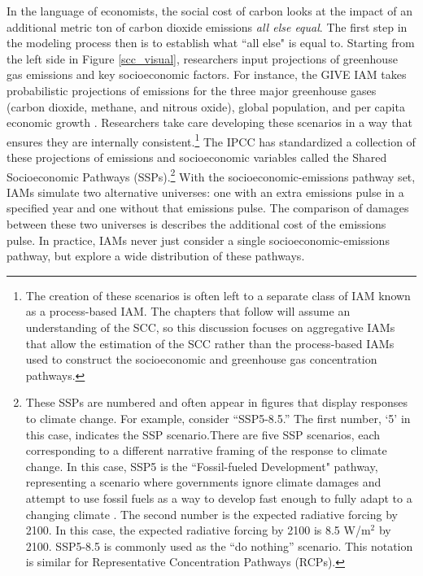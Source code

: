 In the language of economists, the social cost of carbon looks at the impact of an additional metric ton of carbon dioxide emissions \emph{all else equal}. The first step in the modeling process then is to establish what ``all else" is equal to. Starting from the left side in Figure \ref{scc_visual}, researchers input projections of greenhouse gas emissions and key socioeconomic factors. For instance, the GIVE IAM takes probabilistic projections of emissions for the three major greenhouse gases (carbon dioxide, methane, and nitrous oxide), global population, and per capita economic growth \citep{rennert2022comprehensive}. Researchers take care developing these scenarios in a way that ensures they are internally consistent.\footnote{The creation of these scenarios is often left to a separate class of IAM known as a process-based IAM. The chapters that follow will assume an understanding of the SCC, so this discussion focuses on aggregative IAMs that allow the estimation of the SCC rather than the process-based IAMs used to construct the socioeconomic and greenhouse gas concentration pathways.} The IPCC has standardized a collection of these projections of emissions and socioeconomic variables called the Shared Socioeconomic Pathways (SSPs).\footnote{These SSPs are numbered and often appear in figures that display responses to climate change. For example, consider ``SSP5-8.5.'' The first number, `5' in this case, indicates the SSP scenario.There are five SSP scenarios, each corresponding to a different narrative framing of the response to climate change. In this case, SSP5 is the ``Fossil-fueled Development" pathway, representing a scenario where governments ignore climate damages and attempt to use fossil fuels as a way to develop fast enough to fully adapt to a changing climate \citep{hausfather2018explainer}. The second number is the expected radiative forcing by 2100. In this case, the expected radiative forcing by 2100 is 8.5 W/m$^2$ by 2100. SSP5-8.5 is commonly used as the ``do nothing'' scenario. This notation is similar for Representative Concentration Pathways (RCPs).} With the socioeconomic-emissions pathway set, IAMs simulate two alternative universes: one with an extra emissions pulse in a specified year and one without that emissions pulse. The comparison of damages between these two universes is describes the additional cost of the emissions pulse. In practice, IAMs never just consider a single socioeconomic-emissions pathway, but explore a wide distribution of these pathways.

